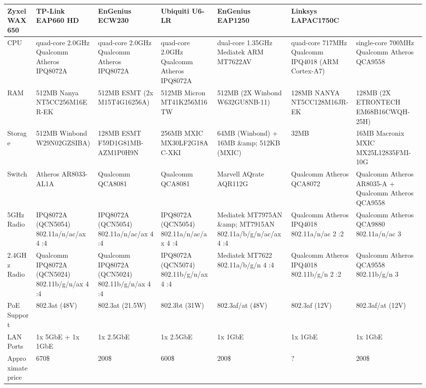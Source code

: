 \documentclass[a4paper,12pt]{report}
\begin{document}
\begin{table}[!ht]
    \centering
    \begin{tabular}{|l|l|l|l|l|l|}
    \hline
        Zyxel WAX650 & TP-Link EAP660 HD & EnGenius ECW230 & Ubiquiti U6-LR & EnGenius EAP1250 & Linksys LAPAC1750C \\
        \hline
        CPU & quad-core 2.0GHz Qualcomm Atheros IPQ8072A & quad-core 2.0GHz Qualcomm Atheros IPQ8072A & quad-core 2.0GHz Qualcomm Atheros IPQ8072A & dual-core 1.35GHz Mediatek ARM MT7622AV & quad-core 717MHz Qualcomm IPQ4018 (ARM Cortex-A7) & single-core 700MHz Qualcomm Atheros QCA9558
        \\
        \hline
        RAM & 512MB Nanya NT5CC256M16ER-EK & 512MB ESMT (2x M15T4G16256A) & 512MB Micron MT41K256M16TW & 512MB (2X Winbond W632GU8NB-11) & 128MB NANYA NT5CC128M16JR-EK & 128MB (2X ETRONTECH EM68B16CWQH-25H)
        \\
        \hline
        Storage & 512MB Winbond W29N02GZSIBA) & 128MB ESMT F59D1G81MB-AZM1P0H9N & 256MB MXIC MX30LF2G18AC-XKI & 64MB (Winbond) + 16MB \&amp; 512KB (MXIC) & 32MB & 16MB Macronix MXIC MX25L12835FMI-10G
        \\
        \hline
        Switch & Atheros AR8033-AL1A & Qualcomm QCA8081 & Qualcomm QCA8081 & Marvell AQrate AQR112G & Qualcomm Atheros QCA8072 & Qualcomm Atheros AR8035-A + Qualcomm Atheros QCA9558
        \\
        \hline
        5GHz Radio & IPQ8072A (QCN5054) 802.11a/n/ac/ax 4 :4 & IPQ8072A (QCN5054) 802.11a/n/ac/ax 4 :4 & IPQ8072A (QCN5054) 802.11a/n/ac/ax 4 :4 & Mediatek MT7975AN \&amp; MT7915AN 802.11a/b/g/n/ac/ax 4 :4 & Qualcomm Atheros IPQ4018 802.11a/n/ac 2 :2 & Qualcomm Atheros QCA9880 802.11a/n/ac 3 
        \\
        \hline
        2.4GHz Radio & Qualcomm IPQ8072A (QCN5024) 802.11b/g/n/ax 4 :4 & Qualcomm IPQ8072A (QCN5024) 802.11b/g/n/ax 4 :4 & IPQ8072A (QCN5074) 802.11b/g/n/ax 4 :4 & Mediatek MT7622 802.11a/b/g/n 4 :4 & Qualcomm Atheros IPQ4018 802.11b/g/n 2 :2 & Qualcomm Atheros QCA9558 802.11b/g/n 3 
        \\
        \hline
        PoE Support & 802.3at (48V) & 802.3at (21.5W) & 802.3bt (31W) & 802.3af/at (48V) & 802.3af (12V) & 802.3af/at (12V)
        \\
        \hline
        LAN Ports & 1x 5GbE + 1x 1GbE & 1x 2.5GbE & 1x 2.5GbE & 1x 1GbE & 1x 1GbE & 1x 1GbE
        \\
        \hline
        Approximate price & 670\$ & 200\$ & 600\$ & 200\$ & ? & 200\$
        \\
        \hline
    \end{tabular}
\end{table}
\end{document}
